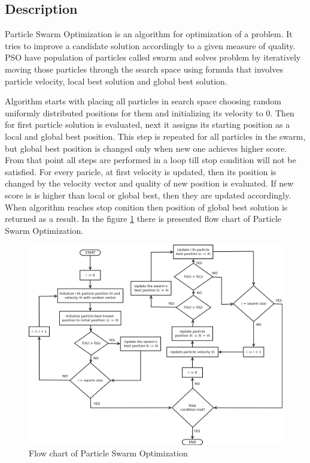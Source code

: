 \subsection{Description}
Particle Swarm Optimization is an algorithm for optimization of a problem. It tries to improve a candidate solution 
accordingly to a given measure of quality. PSO have population of particles called swarm and solves problem by iteratively moving those particles 
through the search space using formula that involves particle velocity, local best solution and global best solution. 

Algorithm starts with placing all particles in search space choosing random uniformly distributed positions for them and initializing its velocity to 0. 
Then for first particle solution is evaluated, next it assigns its starting position as a local and global best position. 
This step is repeated for all particles in the swarm, but global best position is changed only when new one achieves higher score. 
From that point all steps are performed in a loop till stop condition will not be satisfied. For every paricle, at first 
velocity is updated, then its position is changed by the velocity vector and quality of new position is evaluated. 
If new score is is higher than local or global best, then they are updated accordingly. When algorithm reaches stop conition 
then position of global best solution is returned as a result.
In the figure \ref{pso_flowchart} there is presented flow chart of Particle Swarm Optimization.
\begin{figure}[ht]
    \centering
    \includegraphics[scale=0.5]{img/pso_flowchart.png}
    \caption{Flow chart of Particle Swarm Optimization}
    \label{pso_flowchart}
\end{figure}

